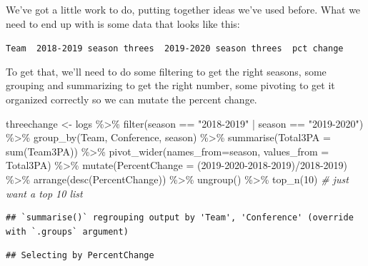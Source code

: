 \documentclass[
]{book}
\newenvironment{Shaded}{\begin{snugshade}}{\end{snugshade}}
\newcommand{\AttributeTok}[1]{\textcolor[rgb]{0.77,0.63,0.00}{#1}}
\newcommand{\CommentTok}[1]{\textcolor[rgb]{0.56,0.35,0.01}{\textit{#1}}}
\newcommand{\DecValTok}[1]{\textcolor[rgb]{0.00,0.00,0.81}{#1}}
\newcommand{\FunctionTok}[1]{\textcolor[rgb]{0.00,0.00,0.00}{#1}}
\newcommand{\NormalTok}[1]{#1}
\newcommand{\OtherTok}[1]{\textcolor[rgb]{0.56,0.35,0.01}{#1}}
\newcommand{\SpecialCharTok}[1]{\textcolor[rgb]{0.00,0.00,0.00}{#1}}
\newcommand{\StringTok}[1]{\textcolor[rgb]{0.31,0.60,0.02}{#1}}
\begin{document}
We've got a little work to do, putting together ideas we've used before. What we need to end up with is some data that looks like this:

\texttt{Team\ \textbar{}\ 2018-2019\ season\ threes\ \textbar{}\ 2019-2020\ season\ threes\ \textbar{}\ pct\ change}

To get that, we'll need to do some filtering to get the right seasons, some grouping and summarizing to get the right number, some pivoting to get it organized correctly so we can mutate the percent change.

\begin{Shaded}
\begin{Highlighting}[]
\NormalTok{threechange }\OtherTok{\textless{}{-}}\NormalTok{ logs }\SpecialCharTok{\%\textgreater{}\%}
  \FunctionTok{filter}\NormalTok{(season }\SpecialCharTok{==} \StringTok{"2018{-}2019"} \SpecialCharTok{|}\NormalTok{ season }\SpecialCharTok{==} \StringTok{"2019{-}2020"}\NormalTok{) }\SpecialCharTok{\%\textgreater{}\%}
  \FunctionTok{group\_by}\NormalTok{(Team, Conference, season) }\SpecialCharTok{\%\textgreater{}\%}
  \FunctionTok{summarise}\NormalTok{(}\AttributeTok{Total3PA =} \FunctionTok{sum}\NormalTok{(Team3PA)) }\SpecialCharTok{\%\textgreater{}\%}
  \FunctionTok{pivot\_wider}\NormalTok{(}\AttributeTok{names\_from=}\NormalTok{season, }\AttributeTok{values\_from =}\NormalTok{ Total3PA) }\SpecialCharTok{\%\textgreater{}\%}
  \FunctionTok{mutate}\NormalTok{(}\AttributeTok{PercentChange =}\NormalTok{ (}\StringTok{\textasciigrave{}}\AttributeTok{2019{-}2020}\StringTok{\textasciigrave{}}\SpecialCharTok{{-}}\StringTok{\textasciigrave{}}\AttributeTok{2018{-}2019}\StringTok{\textasciigrave{}}\NormalTok{)}\SpecialCharTok{/}\StringTok{\textasciigrave{}}\AttributeTok{2018{-}2019}\StringTok{\textasciigrave{}}\NormalTok{) }\SpecialCharTok{\%\textgreater{}\%}
  \FunctionTok{arrange}\NormalTok{(}\FunctionTok{desc}\NormalTok{(PercentChange)) }\SpecialCharTok{\%\textgreater{}\%} 
  \FunctionTok{ungroup}\NormalTok{() }\SpecialCharTok{\%\textgreater{}\%}
  \FunctionTok{top\_n}\NormalTok{(}\DecValTok{10}\NormalTok{) }\CommentTok{\# just want a top 10 list}
\end{Highlighting}
\end{Shaded}

\begin{verbatim}
## `summarise()` regrouping output by 'Team', 'Conference' (override with `.groups` argument)
\end{verbatim}

\begin{verbatim}
## Selecting by PercentChange
\end{verbatim}
\end{document}
